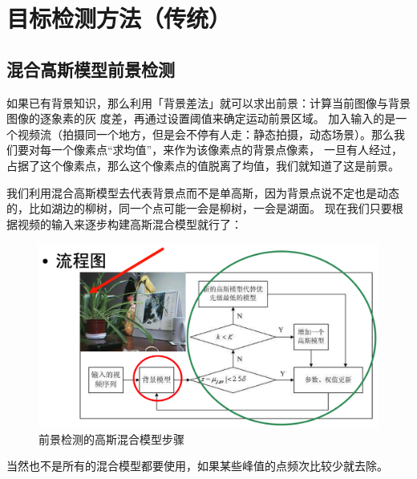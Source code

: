 \documentclass[12pt]{article}
\begin{document}
\section{目标检测方法（传统）}
\subsection{混合高斯模型前景检测}
如果已有背景知识，那么利用「背景差法」就可以求出前景：计算当前图像与背景图像的逐象素的灰 度差，再通过设置阈值来确定运动前景区域。
加入输入的是一个视频流（拍摄同一个地方，但是会不停有人走：静态拍摄，动态场景）。那么我们要对每一个像素点“求均值”，来作为该像素点的背景点像素，
一旦有人经过，占据了这个像素点，那么这个像素点的值脱离了均值，我们就知道了这是前景。

我们利用混合高斯模型去代表背景点而不是单高斯，因为背景点说不定也是动态的，比如湖边的柳树，同一个点可能一会是柳树，一会是湖面。
现在我们只要根据视频的输入来逐步构建高斯混合模型就行了：

\begin{figure}[ht]
    \centering
    \includegraphics[scale=0.5]{./img/GMM.png}
    \caption{前景检测的高斯混合模型步骤}
    \label{fig:GMM}
\end{figure} 
当然也不是所有的混合模型都要使用，如果某些峰值的点频次比较少就去除。
\end{document}

